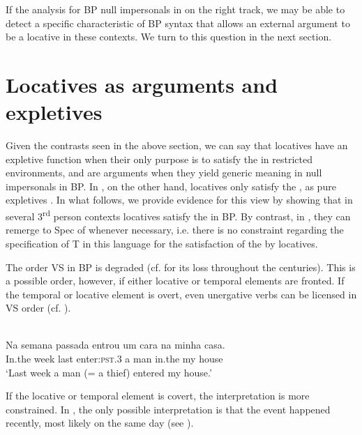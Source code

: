 \documentclass[output=paper]{LSP/langsci}
\begin{document}
If the analysis for BP null impersonals in on the right track, we may be able to detect a specific characteristic of BP syntax that allows an external argument to be a locative in these contexts. We turn to this question in the next section.

\section{Locatives as arguments and expletives}\label{§4.alexiadou}

Given the contrasts seen in the above section, we can say that locatives have an expletive function when their only purpose is to satisfy the  in restricted environments, and are arguments when they yield generic meaning in null impersonals in BP. In , on the other hand, locatives only satisfy the , as pure expletives \citep{HolmbergEtAl2002}. In what follows, we provide evidence for this view by showing that in several 3\textsuperscript{rd} person contexts locatives satisfy the  in BP. By contrast, in , they can remerge to Spec of  whenever necessary, i.e. there is no constraint regarding the specification of T in this language for the satisfaction of the  by locatives.


The order VS in BP is degraded (cf. \citealt{Berlinck1988} for its loss throughout the centuries). This is a possible order, however, if either locative or temporal elements are fronted. If the temporal or locative element is overt, even unergative verbs can be licensed in VS order (cf. \citealt{AvelarEtAl2008,Avelar2009,AvelarGalves2011}).


\ea\label{ex:23.alexiadou}
\\
\gll Na semana passada entrou um cara na minha casa.\\
 In.the week last enter:\textsc{pst}.3 a man in.the my house\\
\glt ‘Last week a man (= a thief) entered my house.’
\z


If the locative or temporal element is covert, the interpretation is more constrained. In , the only possible interpretation is that the event happened recently, most likely on the same day (see \citealt{Pilati2006,PilatiNaves2013}).
\end{document}
